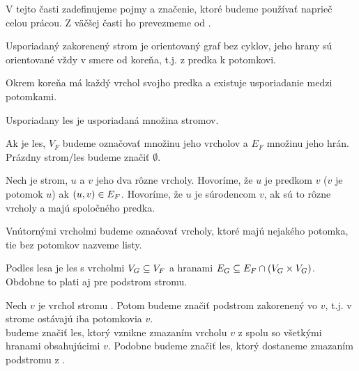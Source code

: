 V tejto časti zadefinujeme pojmy a značenie, ktoré budeme používať naprieč celou prácou.
Z väčšej časti ho prevezmeme od \citet{RTED}.

\begin{definice}\label{def:strom}
  Usporiadaný zakorenený strom je orientovaný graf bez cyklov,
  jeho hrany sú orientované vždy v smere od koreňa, t.j. z predka k potomkovi.

  Okrem koreňa má každý vrchol svojho predka a existuje usporiadanie medzi potomkami.

  Usporiadany les je usporiadaná množina stromov.
\end{definice}

Ak  je les, $V_F$ budeme označovať množinu jeho vrcholov a $E_F$ množinu jeho hrán.
Prázdny strom/les budeme značiť $\emptyset$.

\begin{definice}
  \label{def:stromove_pojmy}
  Nech  je strom, $u$ a $v$ jeho dva rôzne vrcholy.
  Hovoríme, že $u$ je predkom $v$ ($v$ je potomok $u$) ak $(u, v) \in E_{F}$.
  Hovoríme, že $u$ je súrodencom $v$, ak sú to rôzne vrcholy a majú spoločného predka.
\end{definice}

Vnútornými vrcholmi budeme označovať vrcholy, ktoré majú nejakého potomka,
tie bez potomkov nazveme listy.

Podles lesa  je les  s vrcholmi $V_{G} \subseteq V_{F}$
a hranami $E_{G} \subseteq E_{F} \cap (V_{G} \times V_{G})$.
Obdobne to plati aj pre podstrom stromu.

Nech $v$ je vrchol stromu . Potom  budeme značiť podstrom  zakorenený vo $v$,
t.j. v strome ostávajú iba potomkovia $v$.
\\
 budeme značiť les, ktorý vznikne zmazaním vrcholu $v$ z  spolu so
všetkými hranami obsahujúcimi $v$. Podobne  budeme značiť les, ktorý
dostaneme zmazaním podstromu  z .




